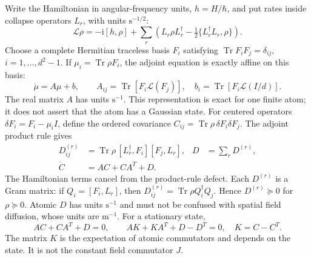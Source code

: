 \documentclass[11pt,a4paper]{article}
\newcommand{\ii}{\mathrm i}
\newcommand{\Tr}{\operatorname{Tr}}
\begin{document}
Write the Hamiltonian in angular-frequency units, $h=H/\hbar$, and put rates
inside collapse operators $L_r$, with units $\mathrm{s}^{-1/2}$:
\begin{equation}
 \mathcal L\rho=-\ii[h,\rho]+\sum_r
 \left(L_r\rho L_r^\dagger-\tfrac12\{L_r^\dagger L_r,\rho\}\right).
 \label{eq:gc-gksl}
\end{equation}
Choose a complete Hermitian traceless basis $F_i$ satisfying
$\Tr F_iF_j=\delta_{ij}$, $i=1,\ldots,d^2-1$. If $\mu_i=\Tr\rho F_i$,
the adjoint equation is exactly affine on this basis:
\begin{equation}
 \dot\mu=A\mu+b,\qquad
 A_{ij}=\Tr[F_i\mathcal L(F_j)],\quad
 b_i=\Tr[F_i\mathcal L(I/d)].
 \label{eq:gc-atomic-drift}
\end{equation}
The real matrix $A$ has units $\mathrm{s}^{-1}$. This representation is exact
for one finite atom; it does not assert that the atom has a Gaussian state.
For centered operators $\delta F_i=F_i-\mu_i I$, define the ordered covariance
$C_{ij}=\Tr\rho\,\delta F_i\delta F_j$. The adjoint product rule gives
\begin{align}
 D^{(r)}_{ij}&=\Tr\rho\,[L_r^\dagger,F_i][F_j,L_r],
 &D&=\sum_rD^{(r)},\label{eq:gc-einstein}\\
 \dot C&=AC+CA^T+D. &&\label{eq:gc-covariance-identity}
\end{align}
The Hamiltonian terms cancel from the product-rule defect. Each $D^{(r)}$
is a Gram matrix: if $Q_i=[F_i,L_r]$, then
$D^{(r)}_{ij}=\Tr\rho Q_i^\dagger Q_j$. Hence $D^{(r)}\succeq0$ for
$\rho\succeq0$. Atomic $D$ has units $\mathrm{s}^{-1}$ and must not be
confused with spatial field diffusion, whose units are $\mathrm{m}^{-1}$.
For a stationary state,
\begin{equation}
 AC+CA^T+D=0,\qquad
 AK+KA^T+D-D^T=0,\quad K=C-C^T.
 \label{eq:gc-stationary-identities}
\end{equation}
The matrix $K$ is the expectation of atomic commutators and depends on the
state. It is not the constant field commutator $J$.
\end{document}
